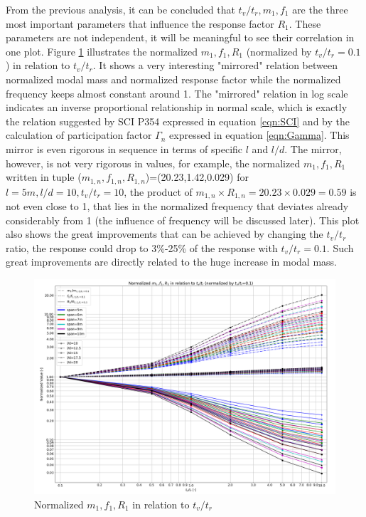 From the previous analysis, it can be concluded that $t_v/t_r, m_1, f_1$ are the three most important parameters that influence the response factor $R_1$. These parameters are not independent, it will be meaningful to see their correlation in one plot. Figure \ref{fig:norm_m1_f1_R1} illustrates the normalized $m_1,f_1,R_1$ (normalized by $t_v/t_r=0.1$) in relation to $t_v/t_r$. It shows a very interesting "mirrored" relation between normalized modal mass and normalized response factor while the normalized frequency keeps almost constant around 1. The "mirrored" relation in log scale indicates an inverse proportional relationship in normal scale, which is exactly the relation suggested by SCI P354 expressed in equation \ref{eqn:SCI} and by the calculation of participation factor $\Gamma_n$ expressed in equation \ref{eqn:Gamma}. This mirror is even rigorous in sequence in terms of specific $l$ and $l/d$. The mirror, however, is not very rigorous in values, for example, the normalized $m_1,f_1,R_1$ written in tuple ($m_{1,n},f_{1,n},R_{1,n}$)=(20.23,1.42,0.029) for $l=5m, l/d=10, t_v/t_r=10$, the product of $m_{1,n}\times R_{1,n}=20.23\times 0.029=0.59$ is not even close to 1, that lies in the normalized frequency that deviates already considerably from 1 (the influence of frequency will be discussed later). This plot also shows the great improvements that can be achieved by changing the $t_v/t_r$ ratio, the response could drop to 3\%-25\% of the response with $t_v/t_r=0.1$. Such great improvements are directly related to the huge increase in modal mass.
\begin{figure}[H]
\centering
\includegraphics[width=1\textwidth]{images/norm_m1_f1_R1}
\caption{Normalized $m_1,f_1,R_1$ in relation to $t_v/t_r$}
\label{fig:norm_m1_f1_R1}
\end{figure}

